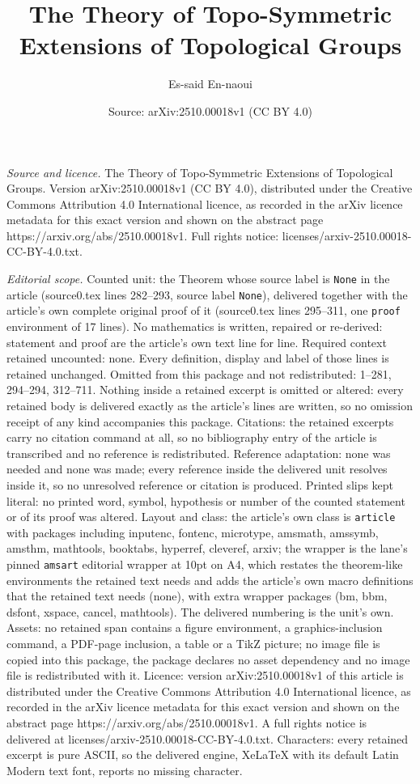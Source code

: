 \documentclass[10pt,a4paper]{amsart}
\title[The Theory of Topo-Symmetric Extensions of Topological Group]{The Theory of Topo-Symmetric Extensions of Topological Groups}
\author{Es-said En-naoui}
\date{Source: arXiv:2510.00018v1 (CC BY 4.0)}
\begin{document}
\maketitle

\noindent\emph{Source and licence.} The Theory of Topo-Symmetric Extensions of Topological Groups. Version arXiv:2510.00018v1 (CC BY 4.0), distributed under the Creative Commons Attribution 4.0 International licence, as recorded in the arXiv licence metadata for this exact version and shown on the abstract page https://arxiv.org/abs/2510.00018v1. Full rights notice: licenses/arxiv-2510.00018-CC-BY-4.0.txt.\par\smallskip

\noindent\textit{Editorial scope.} Counted unit: the Theorem whose source label is \texttt{None} in the article (source0.tex lines 282--293, source label \texttt{None}), delivered together with the article's own complete original proof of it (source0.tex lines 295--311, one \texttt{proof} environment of 17 lines). No mathematics is written, repaired or re-derived: statement and proof are the article's own text line for line. Required context retained uncounted: none. Every definition, display and label of those lines is retained unchanged. Omitted from this package and not redistributed: 1--281, 294--294, 312--711. Nothing inside a retained excerpt is omitted or altered: every retained body is delivered exactly as the article's lines are written, so no omission receipt of any kind accompanies this package. Citations: the retained excerpts carry no citation command at all, so no bibliography entry of the article is transcribed and no reference is redistributed. Reference adaptation: none was needed and none was made; every reference inside the delivered unit resolves inside it, so no unresolved reference or citation is produced. Printed slips kept literal: no printed word, symbol, hypothesis or number of the counted statement or of its proof was altered. Layout and class: the article's own class is \texttt{article} with packages including inputenc, fontenc, microtype, amsmath, amssymb, amsthm, mathtools, booktabs, hyperref, cleveref, arxiv; the wrapper is the lane's pinned \texttt{amsart} editorial wrapper at 10pt on A4, which restates the theorem-like environments the retained text needs and adds the article's own macro definitions that the retained text needs (none), with extra wrapper packages (bm, bbm, dsfont, xspace, cancel, mathtools). The delivered numbering is the unit's own. Assets: no retained span contains a figure environment, a graphics-inclusion command, a PDF-page inclusion, a table or a TikZ picture; no image file is copied into this package, the package declares no asset dependency and no image file is redistributed with it. Licence: version arXiv:2510.00018v1 of this article is distributed under the Creative Commons Attribution 4.0 International licence, as recorded in the arXiv licence metadata for this exact version and shown on the abstract page https://arxiv.org/abs/2510.00018v1. A full rights notice is delivered at licenses/arxiv-2510.00018-CC-BY-4.0.txt. Characters: every retained excerpt is pure ASCII, so the delivered engine, XeLaTeX with its default Latin Modern text font, reports no missing character.
\end{document}
